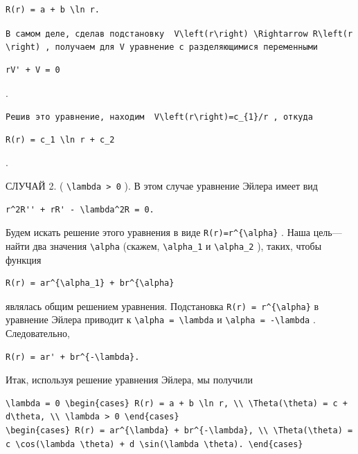 \documentclass[
  ukrainian,
]{article}
\begin{document}
\begin{verbatim}
R(r) = a + b \ln r.
\end{verbatim}

\texttt{В\ самом\ деле,\ сделав\ подстановку\ \ \textquotesingle{}V\textbackslash{}left(r\textbackslash{}right)\ \textbackslash{}Rightarrow\ R\textquotesingle{}\textbackslash{}left(r\textbackslash{}right)\textquotesingle{}\ ,\ получаем\ для\ V\ уравнение\ с\ разделяющимися\ переменными}

\begin{verbatim}
rV' + V = 0
\end{verbatim}

.

\texttt{Решив\ это\ уравнение,\ находим\ \ \textquotesingle{}V\textbackslash{}left(r\textbackslash{}right)=c\_\{1\}/r\textquotesingle{}\ ,\ откуда}

\begin{verbatim}
R(r) = c_1 \ln r + c_2
\end{verbatim}

.

СЛУЧАЙ 2. ( \texttt{\textbackslash{}lambda\ \textgreater{}\ 0} ). В этом
случае уравнение Эйлера имеет вид

\begin{verbatim}
r^2R'' + rR' - \lambda^2R = 0.
\end{verbatim}

Будем искать решение этого уравнения в виде
\texttt{R(r)=r\^{}\{\textbackslash{}alpha\}} . Наша цель---найти два
значения \texttt{\textbackslash{}alpha} (скажем,
\texttt{\textbackslash{}alpha\_1} и \texttt{\textbackslash{}alpha\_2} ),
таких, чтобы функция

\begin{verbatim}
R(r) = ar^{\alpha_1} + br^{\alpha}
\end{verbatim}

являлась общим решением уравнения. Подстановка
\texttt{R(r)\ =\ r\^{}\{\textbackslash{}alpha\}} в уравнение Эйлера
приводит к \texttt{\textbackslash{}alpha\ =\ \textbackslash{}lambda} и
\texttt{\textbackslash{}alpha\ =\ -\textbackslash{}lambda} .
Следовательно,

\begin{verbatim}
R(r) = ar' + br^{-\lambda}.
\end{verbatim}

Итак, используя решение уравнения Эйлера, мы получили

\begin{verbatim}
\lambda = 0 \begin{cases} R(r) = a + b \ln r, \\ \Theta(\theta) = c + d\theta, \\ \lambda > 0 \end{cases}
\begin{cases} R(r) = ar^{\lambda} + br^{-\lambda}, \\ \Theta(\theta) = c \cos(\lambda \theta) + d \sin(\lambda \theta). \end{cases}
\end{verbatim}
\end{document}
